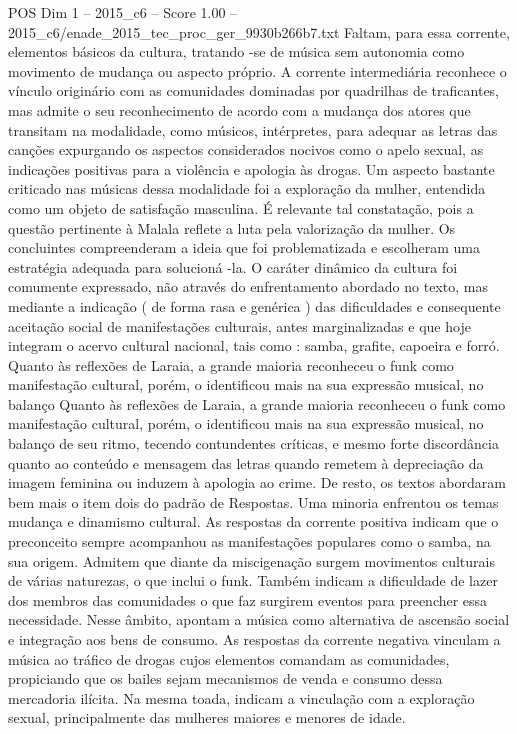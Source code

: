 \begin{textsample}{POS Dim 1 – 2015\_c6 – Score 1.00 – 2015\_c6/enade\_2015\_tec\_proc\_ger\_9930b266b7.txt}
Faltam, para essa corrente, elementos básicos da cultura, tratando -se de música sem autonomia como movimento de mudança ou aspecto próprio.
A corrente intermediária reconhece o vínculo originário com as comunidades dominadas por quadrilhas de traficantes, mas admite o seu reconhecimento de acordo com a mudança dos atores que transitam na modalidade, como músicos, intérpretes, para adequar as letras das canções expurgando os aspectos considerados nocivos como o apelo sexual, as indicações positivas para a violência e apologia às drogas.
Um aspecto bastante criticado nas músicas dessa modalidade foi a exploração da mulher, entendida como um objeto de satisfação masculina.
É relevante tal constatação, pois a questão pertinente à Malala reflete a luta pela valorização da mulher.
Os concluintes compreenderam a ideia que foi problematizada e escolheram uma estratégia adequada para solucioná -la.
O caráter dinâmico da cultura foi comumente expressado, não através do enfrentamento abordado no texto, mas mediante a indicação ( de forma rasa e genérica ) das dificuldades e consequente aceitação social de manifestações culturais, antes marginalizadas e que hoje integram o acervo cultural nacional, tais como : samba, grafite, capoeira e forró.
Quanto às reflexões de Laraia, a grande maioria reconheceu o funk como manifestação cultural, porém, o identificou mais na sua expressão musical, no balanço Quanto às reflexões de Laraia, a grande maioria reconheceu o funk como manifestação cultural, porém, o identificou mais na sua expressão musical, no balanço de seu ritmo, tecendo contundentes críticas, e mesmo forte discordância quanto ao conteúdo e mensagem das letras quando remetem à depreciação da imagem feminina ou induzem à apologia ao crime.
De resto, os textos abordaram bem mais o item dois do padrão de Respostas.
Uma minoria enfrentou os temas mudança e dinamismo cultural.
As respostas da corrente positiva indicam que o preconceito sempre acompanhou as manifestações populares como o samba, na sua origem.
Admitem que diante da miscigenação surgem movimentos culturais de várias naturezas, o que inclui o funk.
Também indicam a dificuldade de lazer dos membros das comunidades o que faz surgirem eventos para preencher essa necessidade.
Nesse âmbito, apontam a música como alternativa de ascensão social e integração aos bens de consumo.
As respostas da corrente negativa vinculam a música ao tráfico de drogas cujos elementos comandam as comunidades, propiciando que os bailes sejam mecanismos de venda e consumo dessa mercadoria ilícita.
Na mesma toada, indicam a vinculação com a exploração sexual, principalmente das mulheres maiores e menores de idade.

\end{textsample}
